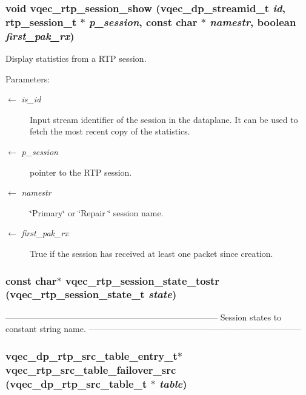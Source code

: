 \subsubsection{\setlength{\rightskip}{0pt plus 5cm}void vqec\_\-rtp\_\-session\_\-show (vqec\_\-dp\_\-streamid\_\-t {\em id}, rtp\_\-session\_\-t $\ast$ {\em p\_\-session}, const char $\ast$ {\em namestr}, boolean {\em first\_\-pak\_\-rx})}\label{vqec__rtp_8c_c0d7e31be1e91cc7f16f7e655c3bb0ff}


Display statistics from a RTP session.

\begin{Desc}
\item[Parameters:]
\begin{description}
\item[\mbox{$\leftarrow$} {\em is\_\-id}]Input stream identifier of the session in the dataplane. It can be used to fetch the most recent copy of the statistics. \item[\mbox{$\leftarrow$} {\em p\_\-session}]pointer to the RTP session. \item[\mbox{$\leftarrow$} {\em namestr}]\char`\"{}Primary\char`\"{} or \char`\"{}Repair \char`\"{} session name. \item[\mbox{$\leftarrow$} {\em first\_\-pak\_\-rx}]True if the session has received at least one packet since creation. \end{description}
\end{Desc}
\subsubsection{\setlength{\rightskip}{0pt plus 5cm}const char$\ast$ vqec\_\-rtp\_\-session\_\-state\_\-tostr (\bf{vqec\_\-rtp\_\-session\_\-state\_\-t} {\em state})}\label{vqec__rtp_8c_21554655b6da62aa13f1f42a82e0202b}


--------------------------------------------------------------------------- Session states to constant string name. --------------------------------------------------------------------------- 
\subsubsection{\setlength{\rightskip}{0pt plus 5cm}vqec\_\-dp\_\-rtp\_\-src\_\-table\_\-entry\_\-t$\ast$ vqec\_\-rtp\_\-src\_\-table\_\-failover\_\-src (vqec\_\-dp\_\-rtp\_\-src\_\-table\_\-t $\ast$ {\em table})}\label{vqec__rtp_8c_9238e5b69456210d90b9eaa979b885c3}


